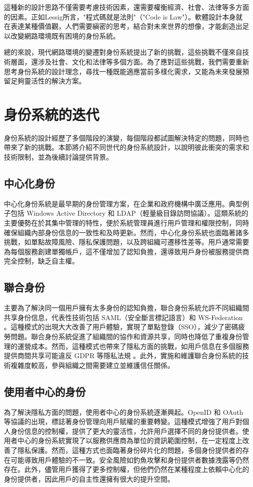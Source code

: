 這種新的設計思路不僅需要考慮技術因素，還需要權衡經濟、社會、法律等多方面的因素。正如Lessig\cite{lessig2000}所言，"程式碼就是法則"（"Code is Law"）。軟體設計本身就在表達某種價值觀，人們需要縝密的思考，結合對未來世界的想像，才能創造出足以改變網路環境既有困境的身份系統。

總的來說，現代網路環境的變遷對身份系統提出了新的挑戰，這些挑戰不僅來自技術層面，還涉及社會、文化和法律等多個方面。為了應對這些挑戰，我們需要重新思考身份系統的設計理念，尋找一種既能適應當前多樣化需求，又能為未來發展預留足夠靈活性的解決方案。
\section{身份系統的迭代}
身份系統的設計經歷了多個階段的演變，每個階段都試圖解決特定的問題，同時也帶來了新的挑戰。本節將介紹不同世代的身份系統設計，以說明彼此衝突的需求和技術限制，並為後續討論提供背景。
\subsection{中心化身份}
中心化身份系統是最早期的身份管理方案，在企業和政府機構中廣泛應用。典型例子包括 Windows Active Directory 和 LDAP（輕量級目錄訪問協議）\cite{microsoft2021active, sermersheim2006lightweight}。這類系統的主要優勢在於其集中管理的特性，便於系統管理員進行用戶管理和權限控制，同時確保組織內部身份信息的一致性和及時更新。然而，中心化身份系統也面臨著諸多挑戰，如單點故障風險、隱私保護問題，以及跨組織可遷移性差等。用戶通常需要為每個服務創建單獨帳戶，這不僅增加了認知負擔\cite{josang2007security}，還導致用戶身份被服務提供商完全控制，缺乏自主權。
\subsection{聯合身份}
主要為了解決同一個用戶擁有太多身份的認知負擔，聯合身份系統允許不同組織間共享身份信息，代表性技術包括 SAML（安全斷言標記語言）和 WS-Federation \cite{oasis2005security, goodner2009web}。這種模式的出現大大改善了用戶體驗，實現了單點登錄（SSO），減少了密碼疲勞問題。聯合身份系統促進了組織間的協作和資源共享，同時也降低了重複身份管理的運營成本。然而，這種模式也帶來了隱私方面的挑戰\cite{ahn2007user}，如用戶信息在多個服務提供商間共享可能違反 GDPR 等隱私法規 \cite{GDPR2016}。此外，實施和維護聯合身份系統的技術複雜度較高，參與組織之間需要建立並維護信任關係。
\subsection{使用者中心的身份}
為了解決隱私方面的問題，使用者中心的身份系統逐漸興起。OpenID 和 OAuth 等協議的出現\cite{sakimura2014openid, hardt2012oauth}，標誌著身份管理向用戶賦權的重要轉變。這種模式增強了用戶對個人身份信息的控制權，提供了更大的靈活性，允許用戶選擇不同的身份提供者。使用者中心的身份系統實現了以服務供應商為單位的資訊範圍控制，在一定程度上改善了隱私保護。然而，這種方式也面臨著身份碎片化的問題，多個身份提供者的存在可能導致用戶體驗的不一致。安全風險如釣魚攻擊和身份提供者數據洩露等仍然存在\cite{sun2012devil}。此外，儘管用戶獲得了更多控制權，但他們仍然在某種程度上依賴中心化的身份提供者，因此用戶的自主性還擁有很大的提升空間\cite{allen2016selfsovereign}。
